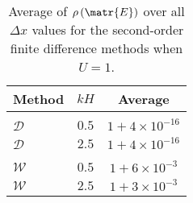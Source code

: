 \begin{table}
	\centering
	\begin{tabular}{l  c  c}
		Method & $kH$& Average\\
		\hline && \\
		$\mathcal{D}$ & $0.5$ & $1+ 4\times 10^{-16}$  \\
		$\mathcal{D}$ & $2.5$ & $1+ 4\times 10^{-16}$  \\
		\hline \\
		$\mathcal{W}$ & $0.5$ & $1+ 6\times 10^{-3}$  \\
		$\mathcal{W}$ & $2.5$ & $1+ 3\times 10^{-3}$   \\
	\end{tabular}
	\caption{Average of $\rho\left(\matr{E}\right)$ over all $\Delta x$ values for the second-order finite difference methods when $U=1$.}
	\label{tab:Averageofspectralradiusu=1}
\end{table}